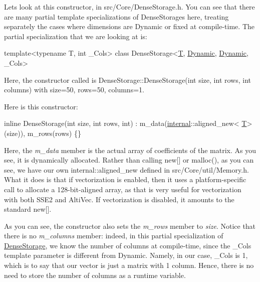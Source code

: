 Let\textquotesingle{}s look at this constructor, in src/\+Core/\+Dense\+Storage.\+h. You can see that there are many partial template specializations of Dense\+Storages here, treating separately the cases where dimensions are Dynamic or fixed at compile-\/time. The partial specialization that we are looking at is\+: 
\begin{DoxyCode}
\textcolor{keyword}{template}<\textcolor{keyword}{typename} T, \textcolor{keywordtype}{int} \_Cols> \textcolor{keyword}{class }DenseStorage<\hyperlink{group___sparse_core___module_class_eigen_1_1_triplet}{T}, \hyperlink{namespace_eigen_ad81fa7195215a0ce30017dfac309f0b2}{Dynamic}, \hyperlink{namespace_eigen_ad81fa7195215a0ce30017dfac309f0b2}{Dynamic}, \_Cols>
\end{DoxyCode}


Here, the constructor called is Dense\+Storage\+::\+Dense\+Storage(int size, int rows, int columns) with size=50, rows=50, columns=1.

Here is this constructor\+: 
\begin{DoxyCode}
\textcolor{keyword}{inline} DenseStorage(\textcolor{keywordtype}{int} size, \textcolor{keywordtype}{int} rows, \textcolor{keywordtype}{int}) : m\_data(\hyperlink{namespaceinternal}{internal}::aligned\_new<
      \hyperlink{group___sparse_core___module_class_eigen_1_1_triplet}{T}>(size)), m\_rows(rows) \{\}
\end{DoxyCode}


Here, the {\itshape m\+\_\+data} member is the actual array of coefficients of the matrix. As you see, it is dynamically allocated. Rather than calling new\mbox{[}\mbox{]} or malloc(), as you can see, we have our own internal\+::aligned\+\_\+new defined in src/\+Core/util/\+Memory.\+h. What it does is that if vectorization is enabled, then it uses a platform-\/specific call to allocate a 128-\/bit-\/aligned array, as that is very useful for vectorization with both S\+S\+E2 and Alti\+Vec. If vectorization is disabled, it amounts to the standard new\mbox{[}\mbox{]}.

As you can see, the constructor also sets the {\itshape m\+\_\+rows} member to {\itshape size}. Notice that there is no {\itshape m\+\_\+columns} member\+: indeed, in this partial specialization of \hyperlink{class_eigen_1_1_dense_storage}{Dense\+Storage}, we know the number of columns at compile-\/time, since the \+\_\+\+Cols template parameter is different from Dynamic. Namely, in our case, \+\_\+\+Cols is 1, which is to say that our vector is just a matrix with 1 column. Hence, there is no need to store the number of columns as a runtime variable.

